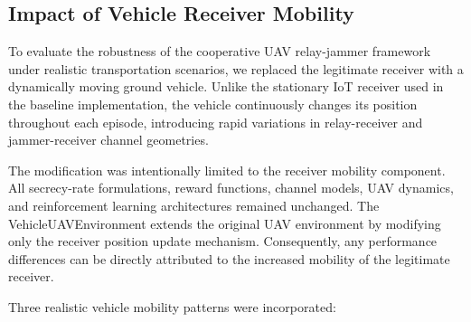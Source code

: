 \documentclass[journal,onecolumn]{IEEEtran}
\begin{document}

\subsection{Impact of Vehicle Receiver Mobility}

To evaluate the robustness of the cooperative UAV relay-jammer framework under realistic transportation scenarios, we replaced the legitimate receiver with a dynamically moving ground vehicle. Unlike the stationary IoT receiver used in the baseline implementation, the vehicle continuously changes its position throughout each episode, introducing rapid variations in relay-receiver and jammer-receiver channel geometries.

The modification was intentionally limited to the receiver mobility component. All secrecy-rate formulations, reward functions, channel models, UAV dynamics, and reinforcement learning architectures remained unchanged. The VehicleUAVEnvironment extends the original UAV environment by modifying only the receiver position update mechanism. Consequently, any performance differences can be directly attributed to the increased mobility of the legitimate receiver.

Three realistic vehicle mobility patterns were incorporated:
\end{document}
